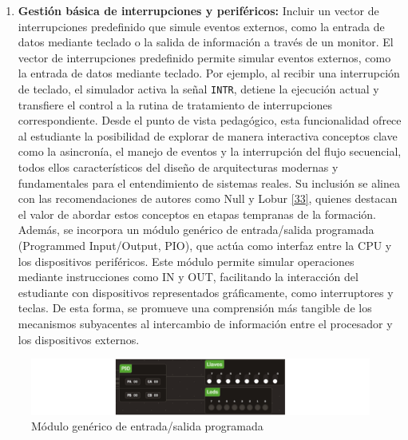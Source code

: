 \documentclass[12pt,oneside]{templates/unerthesis}
\providecommand{\tightlist}{%
  \setlength{\itemsep}{0pt}\setlength{\parskip}{0pt}}
\begin{document}
\begin{enumerate}
\def\labelenumi{\arabic{enumi}.}
\setcounter{enumi}{4}
\tightlist
\item
  \textbf{Gestión básica de interrupciones y periféricos:}
  Incluir un vector de interrupciones predefinido que simule eventos externos, como la entrada de datos mediante teclado o la salida de información a través de un monitor. El vector de interrupciones predefinido permite simular eventos externos, como la entrada de datos mediante teclado. Por ejemplo, al recibir una interrupción de teclado, el simulador activa la señal \texttt{INTR}, detiene la ejecución actual y transfiere el control a la rutina de tratamiento de interrupciones correspondiente. Desde el punto de vista pedagógico, esta funcionalidad ofrece al estudiante la posibilidad de explorar de manera interactiva conceptos clave como la asincronía, el manejo de eventos y la interrupción del flujo secuencial, todos ellos característicos del diseño de arquitecturas modernas y fundamentales para el entendimiento de sistemas reales. Su inclusión se alinea con las recomendaciones de autores como Null y Lobur \protect\hyperlink{ref-null_essentials_2023}{{[}33{]}}, quienes destacan el valor de abordar estos conceptos en etapas tempranas de la formación. Además, se incorpora un módulo genérico de entrada/salida programada (Programmed Input/Output, PIO), que actúa como interfaz entre la CPU y los dispositivos periféricos. Este módulo permite simular operaciones mediante instrucciones como IN y OUT, facilitando la interacción del estudiante con dispositivos representados gráficamente, como interruptores y teclas. De esta forma, se promueve una comprensión más tangible de los mecanismos subyacentes al intercambio de información entre el procesador y los dispositivos externos.
\end{enumerate}

\begin{figure}

{\centering \includegraphics[width=1\linewidth]{images/perifericos} 

}

\caption{Módulo genérico de entrada/salida programada}\label{fig:perifericos}
\end{figure}
\end{document}
